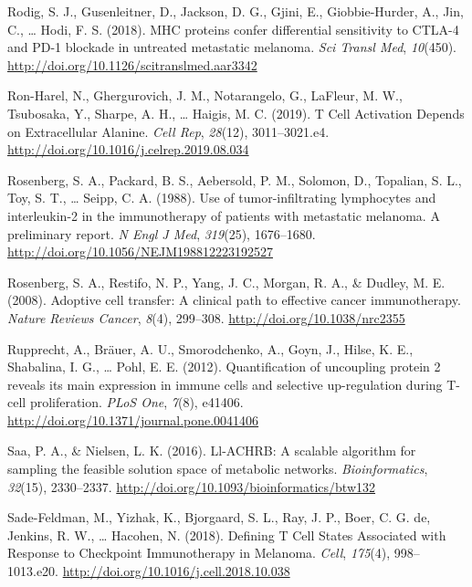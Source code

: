 \documentclass[12pt,twoside,openany,\mydriver]{thesis}  %
\begin{document}
\leavevmode\hypertarget{ref-rodig_mhc_2018}{}%
Rodig, S. J., Gusenleitner, D., Jackson, D. G., Gjini, E., Giobbie-Hurder, A., Jin, C., \ldots{} Hodi, F. S. (2018). MHC proteins confer differential sensitivity to CTLA-4 and PD-1 blockade in untreated metastatic melanoma. \emph{Sci Transl Med}, \emph{10}(450). \url{http://doi.org/10.1126/scitranslmed.aar3342}

\leavevmode\hypertarget{ref-ron-harel_t_2019}{}%
Ron-Harel, N., Ghergurovich, J. M., Notarangelo, G., LaFleur, M. W., Tsubosaka, Y., Sharpe, A. H., \ldots{} Haigis, M. C. (2019). T Cell Activation Depends on Extracellular Alanine. \emph{Cell Rep}, \emph{28}(12), 3011--3021.e4. \url{http://doi.org/10.1016/j.celrep.2019.08.034}

\leavevmode\hypertarget{ref-rosenberg_use_1988}{}%
Rosenberg, S. A., Packard, B. S., Aebersold, P. M., Solomon, D., Topalian, S. L., Toy, S. T., \ldots{} Seipp, C. A. (1988). Use of tumor-infiltrating lymphocytes and interleukin-2 in the immunotherapy of patients with metastatic melanoma. A preliminary report. \emph{N Engl J Med}, \emph{319}(25), 1676--1680. \url{http://doi.org/10.1056/NEJM198812223192527}

\leavevmode\hypertarget{ref-rosenberg_adoptive_2008}{}%
Rosenberg, S. A., Restifo, N. P., Yang, J. C., Morgan, R. A., \& Dudley, M. E. (2008). Adoptive cell transfer: A clinical path to effective cancer immunotherapy. \emph{Nature Reviews Cancer}, \emph{8}(4), 299--308. \url{http://doi.org/10.1038/nrc2355}

\leavevmode\hypertarget{ref-rupprecht_quantification_2012}{}%
Rupprecht, A., Bräuer, A. U., Smorodchenko, A., Goyn, J., Hilse, K. E., Shabalina, I. G., \ldots{} Pohl, E. E. (2012). Quantification of uncoupling protein 2 reveals its main expression in immune cells and selective up-regulation during T-cell proliferation. \emph{PLoS One}, \emph{7}(8), e41406. \url{http://doi.org/10.1371/journal.pone.0041406}

\leavevmode\hypertarget{ref-saa_ll-achrb_2016}{}%
Saa, P. A., \& Nielsen, L. K. (2016). Ll-ACHRB: A scalable algorithm for sampling the feasible solution space of metabolic networks. \emph{Bioinformatics}, \emph{32}(15), 2330--2337. \url{http://doi.org/10.1093/bioinformatics/btw132}

\leavevmode\hypertarget{ref-sade-feldman_defining_2018}{}%
Sade-Feldman, M., Yizhak, K., Bjorgaard, S. L., Ray, J. P., Boer, C. G. de, Jenkins, R. W., \ldots{} Hacohen, N. (2018). Defining T Cell States Associated with Response to Checkpoint Immunotherapy in Melanoma. \emph{Cell}, \emph{175}(4), 998--1013.e20. \url{http://doi.org/10.1016/j.cell.2018.10.038}
\end{document}
